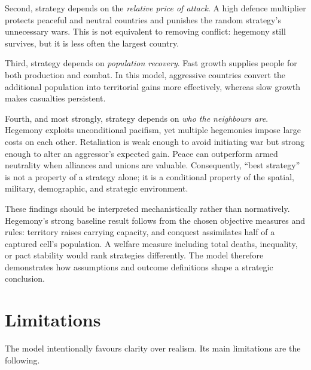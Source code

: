 \documentclass[10pt,twocolumn]{article}
\begin{document}
Second, strategy depends on the \emph{relative price of attack}.  A high
defence multiplier protects peaceful and neutral countries and punishes the
random strategy's unnecessary wars.  This is not equivalent to removing
conflict: hegemony still survives, but it is less often the largest country.

Third, strategy depends on \emph{population recovery}.  Fast growth supplies
people for both production and combat.  In this model, aggressive countries
convert the additional population into territorial gains more effectively,
whereas slow growth makes casualties persistent.

Fourth, and most strongly, strategy depends on \emph{who the neighbours are}.
Hegemony exploits unconditional pacifism, yet multiple hegemonies impose large
costs on each other.  Retaliation is weak enough to avoid initiating war but
strong enough to alter an aggressor's expected gain.  Peace can outperform
armed neutrality when alliances and unions are valuable.  Consequently,
``best strategy'' is not a property of a strategy alone; it is a conditional
property of the spatial, military, demographic, and strategic environment.

These findings should be interpreted mechanistically rather than normatively.
Hegemony's strong baseline result follows from the chosen objective measures
and rules: territory raises carrying capacity, and conquest assimilates half
of a captured cell's population.  A welfare measure including total deaths,
inequality, or pact stability would rank strategies differently.  The model
therefore demonstrates how assumptions and outcome definitions shape a
strategic conclusion.

\section{Limitations}

The model intentionally favours clarity over realism.  Its main limitations
are the following.
\end{document}
